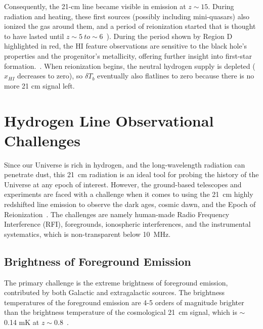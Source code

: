 	    
	    Consequently, the 21-cm line became visible in emission at $z\sim15$. During radiation and heating, these first sources (possibly including mini-quasars) also ionized the gas around them, and a period of reionization started that is thought to have lasted until $z\sim5~to\sim 6$~\citep{2015aska.confE...1K}). During the period shown by Region D highlighted in red, the HI feature observations are sensitive to the black hole's properties and the progenitor's metallicity, offering further insight into first-star formation.~\citep{11}. When reionization begins, the neutral hydrogen supply is depleted ($x_{HI}$ decreases to zero), so $\delta T_b$ eventually also flatlines to zero because there is no more 21 cm signal left. \\ 
	    
	    \section{Hydrogen Line Observational Challenges}
	    
	    
	    Since our Universe is rich in hydrogen, and the long-wavelength radiation can penetrate dust, this \SI{21}{cm} radiation is an ideal tool for probing the history of the Universe at any epoch of interest. However, the ground-based telescopes and experiments are faced with a challenge when it comes to using the \SI{21}{cm} highly redshifted line emission to observe the dark ages, cosmic dawn, and the Epoch of Reionization~\citep{2016ExA....41..271R}. The challenges are namely human-made Radio Frequency Interference (RFI), foregrounds, ionospheric interferences, and the instrumental systematics, which is non-transparent below \SI{10}{MHz}. 
	    
	    \subsection*{Brightness of Foreground Emission}
	    
	    The	primary challenge is the extreme brightness of foreground emission, contributed by both Galactic and extragalactic sources.
	    The brightness temperatures of the foreground emission are 4-5 orders of magnitude brighter than the brightness temperature of the cosmological \SI{21}{cm} signal, which is $\sim$ 0.14 mK at $z\sim0.8$~\citep{2018RAA....18..114H}.
	    
